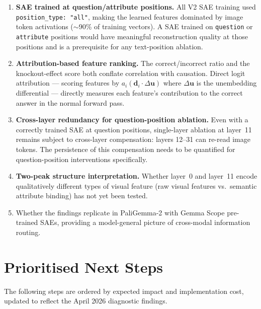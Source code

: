 \documentclass[11pt,a4paper]{article}
\begin{document}
\begin{enumerate}
  \item \textbf{SAE trained at question/attribute positions.}
    All V2 SAE training used \texttt{position\_type: "all"}, making the learned features
    dominated by image token activations ($\sim$90\% of training vectors).
    A SAE trained on \texttt{question} or \texttt{attribute} positions would have meaningful
    reconstruction quality at those positions and is a prerequisite for any text-position ablation.

  \item \textbf{Attribution-based feature ranking.}
    The correct/incorrect ratio and the knockout-effect score both conflate correlation with
    causation. Direct logit attribution — scoring features by $a_i (\mathbf{d}_i \cdot \Delta
    \mathbf{u})$ where $\Delta\mathbf{u}$ is the unembedding differential — directly measures
    each feature's contribution to the correct answer in the normal forward pass.

  \item \textbf{Cross-layer redundancy for question-position ablation.}
    Even with a correctly trained SAE at question positions, single-layer ablation at layer~11
    remains subject to cross-layer compensation: layers 12--31 can re-read image tokens.
    The persistence of this compensation needs to be quantified for question-position
    interventions specifically.

  \item \textbf{Two-peak structure interpretation.}
    Whether layer~0 and layer~11 encode qualitatively different types of visual feature
    (raw visual features vs.\ semantic attribute binding) has not yet been tested.

  \item Whether the findings replicate in PaliGemma-2 with Gemma Scope pre-trained SAEs,
    providing a model-general picture of cross-modal information routing.
\end{enumerate}


\section{Prioritised Next Steps}
\label{sec:next}

The following steps are ordered by expected impact and implementation cost,
updated to reflect the April 2026 diagnostic findings.
\end{document}
